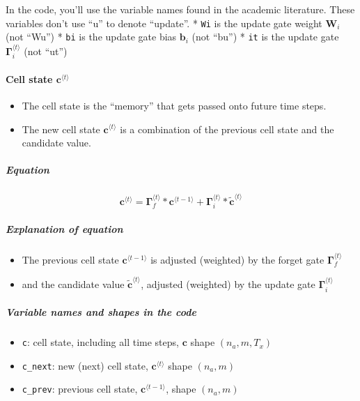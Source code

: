 \documentclass[11pt]{article}
\providecommand{\tightlist}{%
      \setlength{\itemsep}{0pt}\setlength{\parskip}{0pt}}
\begin{document}
In the code, you'll use the variable names found in the academic
literature. These variables don't use ``u'' to denote ``update''. *
\texttt{Wi} is the update gate weight \(\mathbf{W}_i\) (not ``Wu'') *
\texttt{bi} is the update gate bias \(\mathbf{b}_i\) (not ``bu'') *
\texttt{it} is the update gate \(\mathbf{\Gamma}_i^{\langle t \rangle}\)
(not ``ut'')

    \hypertarget{cell-state-mathbfclangle-t-rangle}{%
\paragraph{\texorpdfstring{Cell state
\(\mathbf{c}^{\langle t \rangle}\)}{Cell state \textbackslash mathbf\{c\}\^{}\{\textbackslash langle t \textbackslash rangle\}}}\label{cell-state-mathbfclangle-t-rangle}}

\begin{itemize}
\tightlist
\item
  The cell state is the ``memory'' that gets passed onto future time
  steps.
\item
  The new cell state \(\mathbf{c}^{\langle t \rangle}\) is a combination
  of the previous cell state and the candidate value.
\end{itemize}

\hypertarget{equation}{%
\subparagraph{Equation}\label{equation}}

\[ \mathbf{c}^{\langle t \rangle} = \mathbf{\Gamma}_f^{\langle t \rangle}* \mathbf{c}^{\langle t-1 \rangle} + \mathbf{\Gamma}_{i}^{\langle t \rangle} *\mathbf{\tilde{c}}^{\langle t \rangle} \tag{4} \]

\hypertarget{explanation-of-equation}{%
\subparagraph{Explanation of equation}\label{explanation-of-equation}}

\begin{itemize}
\tightlist
\item
  The previous cell state \(\mathbf{c}^{\langle t-1 \rangle}\) is
  adjusted (weighted) by the forget gate
  \(\mathbf{\Gamma}_{f}^{\langle t \rangle}\)
\item
  and the candidate value \(\tilde{\mathbf{c}}^{\langle t \rangle}\),
  adjusted (weighted) by the update gate
  \(\mathbf{\Gamma}_{i}^{\langle t \rangle}\)
\end{itemize}

\hypertarget{variable-names-and-shapes-in-the-code}{%
\subparagraph{Variable names and shapes in the
code}\label{variable-names-and-shapes-in-the-code}}

\begin{itemize}
\tightlist
\item
  \texttt{c}: cell state, including all time steps, \(\mathbf{c}\) shape
  \((n_{a}, m, T_x)\)
\item
  \texttt{c\_next}: new (next) cell state,
  \(\mathbf{c}^{\langle t \rangle}\) shape \((n_{a}, m)\)
\item
  \texttt{c\_prev}: previous cell state,
  \(\mathbf{c}^{\langle t-1 \rangle}\), shape \((n_{a}, m)\)
\end{itemize}
\end{document}
